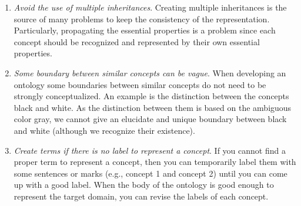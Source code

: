 \begin{enumerate}
\item \emph{Avoid the use of multiple inheritances}.
Creating multiple inheritances is the source of many problems to keep the consistency of the representation.
Particularly, propagating the essential properties is a problem since each concept should be recognized and represented by their own essential properties.

\item \emph{Some boundary between similar concepts can be vague}. 
When developing an ontology some boundaries between similar concepts do not need to be strongly conceptualized.
An example is the distinction between the concepts black and white.
As the distinction between them is based on the ambiguous color gray, we cannot give an elucidate and unique boundary between black and white (although we recognize their existence).

\item
\emph{Create terms if there is no label to represent a concept}.
If you cannot find a proper term to represent a concept, then you can temporarily label them with some sentences or marks (e.g., concept 1 and concept 2) until you can come up with a good label.
When the body of the ontology is good enough to represent the target domain, you can revise the labels of each concept.
\end{enumerate}



